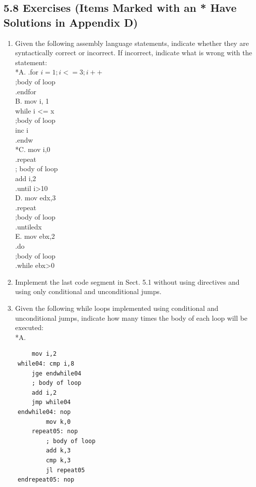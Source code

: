 \documentclass[10pt]{book}
\begin{document}
\subsection*{5.8 Exercises (Items Marked with an * Have Solutions in Appendix D)}
\begin{enumerate}
  \item Given the following assembly language statements, indicate whether they are syntactically correct or incorrect. If incorrect, indicate what is wrong with the statement:\\
*A. .for $i=1 ; i<=3 ; i++$\\
;body of loop\\
.endfor\\
B. mov i, 1\\
while i <= x\\
;body of loop\\
inc i\\
.endw\\
*C. mov i,0\\
.repeat\\
; body of loop\\
add i,2\\
.until i>10\\
D. mov edx,3\\
.repeat\\
;body of loop\\
.untiledx\\
E. mov ebx,2\\
.do\\
;body of loop\\
.while ebx>0
  \item Implement the last code segment in Sect. 5.1 without using directives and using only conditional and unconditional jumps.
  \item Given the following while loops implemented using conditional and unconditional jumps, indicate how many times the body of each loop will be executed:\\
*A.
\end{enumerate}

\begin{verbatim}
        mov i,2
    while04: cmp i,8
        jge endwhile04
        ; body of loop
        add i,2
        jmp while04
    endwhile04: nop
            mov k,0
        repeat05: nop
            ; body of loop
            add k,3
            cmp k,3
            jl repeat05
    endrepeat05: nop
\end{verbatim}
\end{document}

